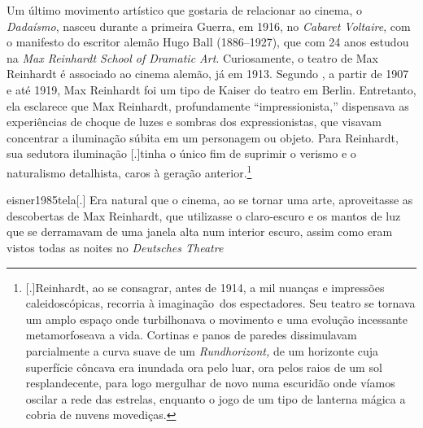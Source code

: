 Um último movimento artístico que gostaria de relacionar ao cinema, o
\emph{Dadaísmo}, nasceu durante a primeira Guerra, em 1916, no
\emph{Cabaret Voltaire}, com o manifesto do escritor alemão Hugo Ball
(1886--1927), que com 24 anos estudou na \emph{Max Reinhardt School of
	Dramatic Art}. Curiosamente, o teatro de Max Reinhardt é associado ao
cinema alemão, já em 1913. Segundo \textcite[44]{eisner1985tela}, a
partir de 1907 e até 1919, Max Reinhardt foi um tipo de Kaiser do
teatro em Berlin. Entretanto, ela esclarece que Max Reinhardt,
profundamente \enquote{impressionista,} dispensava as experiências de
choque de luzes e sombras dos expressionistas, que visavam concentrar a
iluminação súbita em um personagem ou objeto. Para Reinhardt, sua
sedutora iluminação [.]{tinha o único
	fim de suprimir o verismo e o naturalismo detalhista, caros à geração
	anterior}.\footnote{[.]{Reinhardt, ao se consagrar, antes de
		1914, a mil nuanças e impressões caleidoscópicas, recorria à imaginação~dos
    espectadores. Seu teatro se tornava um amplo espaço onde
		turbilhonava o movimento e uma evolução incessante metamorfoseava a
		vida. Cortinas e panos de paredes dissimulavam parcialmente a curva
		suave de um \emph{Rundhorizont,} de um horizonte cuja superfície
		côncava era inundada ora pelo luar, ora pelos raios de um sol
		resplandecente, para logo mergulhar de novo numa escuridão onde víamos
		oscilar a rede das estrelas, enquanto o jogo de um tipo de lanterna
		mágica a cobria de nuvens movediças}.}

\begin{displaycquote}[44]{eisner1985tela}[.]
	Era natural que o cinema, ao se tornar uma arte, aproveitasse as
	descobertas de Max Reinhardt, que utilizasse o claro-escuro e os mantos
	de luz que se derramavam de uma janela alta num interior escuro, assim
	como eram vistos todas as noites no \emph{Deutsches Theatre}
\end{displaycquote}

